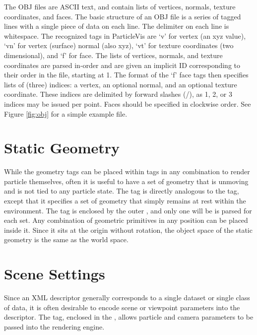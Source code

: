 The OBJ files are ASCII text, and contain lists of vertices, normals, texture coordinates, and faces.  The basic structure of an OBJ file is a series of tagged lines with a single piece of data on each line.  The delimiter on each line is whitespace.  The recognized tags in ParticleVis are `v' for vertex (an xyz value), `vn' for vertex (surface) normal (also xyz), `vt' for texture coordinates (two dimensional), and `f' for face.  The lists of vertices, normals, and texture coordinates are parsed in-order and are given an implicit ID corresponding to their order in the file, starting at 1.  The format of the `f' face tags then specifies lists of (three) indices: a vertex, an optional normal, and an optional texture coordinate.  These indices are delimited by forward slashes (/), as 1, 2, or 3 indices may be issued per point.  Faces should be specified in clockwise order.  See Figure \ref{fig:obj} for a simple example file.

\section{Static Geometry}
While the geometry tags can be placed within  tags in any combination to render particle themselves, often it is useful to have a set of geometry that is unmoving and is not tied to any particle state.  
The  tag is directly analogous to the  tag, except that it specifies a set of geometry that simply remains at rest within the environment.  The  tag is enclosed by the outer , and only one will be is parsed for each set.  Any combination of geometric primitives in any position can be placed inside it.  Since it sits at the origin without rotation, the object space of the static geometry is the same as the world space.


\section{Scene Settings}
Since an XML descriptor generally corresponds to a single dataset or single class of data, it is often desirable to encode scene or viewpoint parameters into the descriptor.  The  tag, enclosed in the , allows particle and camera parameters to be passed into the rendering engine.

